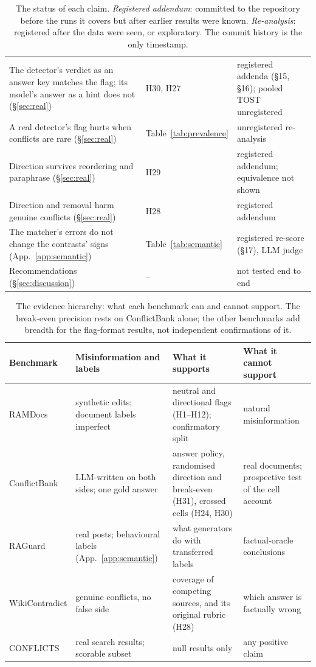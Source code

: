 \begin{table}[t]
\begin{tabular}{p{7.4cm}p{3.6cm}p{4.2cm}}
The detector's verdict as an answer key matches the flag; its model's answer as a hint does not (\S\ref{sec:real}) & H30, H27 & registered addenda (\S15, \S16); pooled TOST unregistered \\
A real detector's flag hurts when conflicts are rare (\S\ref{sec:real}) & Table~\ref{tab:prevalence} & unregistered re-analysis \\
Direction survives reordering and paraphrase (\S\ref{sec:real}) & H29 & registered addendum; equivalence not shown \\
Direction and removal harm genuine conflicts (\S\ref{sec:real}) & H28 & registered addendum \\
The matcher's errors do not change the contrasts' signs (App.~\ref{app:semantic}) & Table~\ref{tab:semantic} & registered re-score (\S17), LLM judge \\
Recommendations (\S\ref{sec:discussion}) & -- & not tested end to end \\
\bottomrule
\end{tabular}
\caption{The status of each claim. \emph{Registered addendum}: committed to the repository before the runs it covers but
after earlier results were known. \emph{Re-analysis}: registered after the data were seen, or exploratory. The commit
history is the only timestamp.}
\label{tab:claims}
\end{table}

\begin{table}[t]
\centering\footnotesize
\setlength{\tabcolsep}{4pt}
\begin{tabular}{p{2.3cm}p{3.6cm}p{4.4cm}p{4.6cm}}
\toprule
Benchmark & Misinformation and labels & What it supports & What it cannot support \\
\midrule
RAMDocs & synthetic edits; document labels imperfect & neutral and directional flags (H1--H12); confirmatory split & natural misinformation \\
ConflictBank & LLM-written on both sides; one gold answer & answer policy, randomised direction and break-even (H31), crossed cells (H24, H30) & real documents; prospective test of the cell account \\
RAGuard & real posts; behavioural labels (App.~\ref{app:semantic}) & what generators do with transferred labels & factual-oracle conclusions \\
WikiContradict & genuine conflicts, no false side & coverage of competing sources, and its original rubric (H28) & which answer is factually wrong \\
CONFLICTS & real search results; scorable subset & null results only & any positive claim \\
\bottomrule
\end{tabular}
\caption{The evidence hierarchy: what each benchmark can and cannot support. The break-even precision rests on
ConflictBank alone; the other benchmarks add breadth for the flag-format results, not independent confirmations of it.}
\label{tab:evidence}
\end{table}

